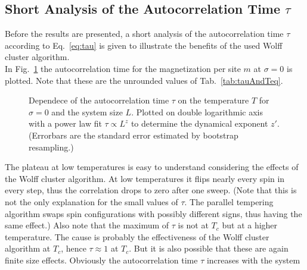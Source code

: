 \subsection{Short Analysis of the Autocorrelation Time  $\tau$}
\label{ssec:results:autocorr}
    Before the results are presented, a short analysis of the
    autocorrelation time \(\tau\) according to Eq.\ \ref{eq:tau} is given to
    illustrate the benefits of the used Wolff cluster algorithm.\\
    In Fig.\ \ref{fig:autocorr}
    the autocorrelation time for the magnetization per site \(m\) at
    \(\sigma=0\) is plotted. Note that these are the unrounded values
    of Tab.\ \ref{tab:tauAndTeq}.
    \begin{figure}[htbp]
        \centering
        \caption[The Autocorrelation Time $\tau$]
        {
            Dependece of the autocorrelation time $\tau$ on
             the temperature $T$ for
                $\sigma=0$ and
             the system size $L$. Plotted on
                double logarithmic axis with a power law fit \(\tau \propto L^z\)
                to determine the dynamical exponent \(z'\).
                (Errorbars are the standard error estimated by bootstrap resampling.)
        }
        \label{fig:autocorr}
    \end{figure}
    The plateau at low temperatures is easy to understand considering the
    effects of the Wolff cluster algorithm. At low temperatures it flips nearly every
    spin in every step, thus the correlation drops to zero after one sweep.
    (Note that this is not the only explanation for the small values of \(\tau\).
    The parallel tempering algorithm swaps spin configurations
    with possibly different signs, thus having the same effect.)
    Also note that the maximum of \(\tau\) is not at \(T_c\) but at a higher
    temperature. The cause is probably the effectiveness of the Wolff cluster
    algorithm at \(T_c\), hence \(\tau \approx 1\) at \(T_{c}\).
    But it is also possible that these are again finite size effects.
    Obviously the autocorrelation time \(\tau\) increases with the system

